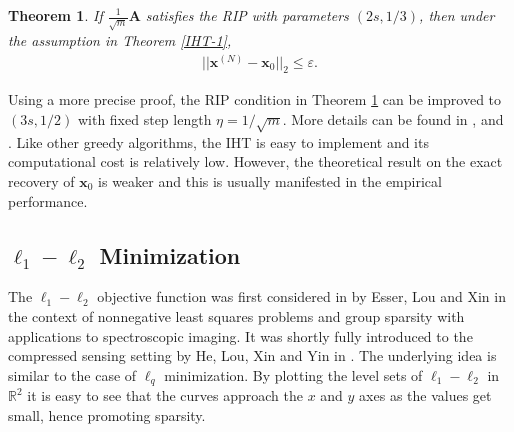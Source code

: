 \documentclass[11pt]{article}
\numberwithin{equation}{section}
\theoremstyle{plain}
\newtheorem{Th}{Theorem}[section]
\theoremstyle{definition}
\def\R{{\mathbb R}}
\def\R{{\mathbb R}}
\def\A{{\mathbf A}}
\def\x{{\mathbf x}}
\def\e{{\varepsilon}}
\begin{document}
\begin{Th}\label{IHT-2}
If $\frac{1}{\sqrt{m}}\A$ satisfies the RIP with parameters $(2s, 1/3)$, then under the assumption in Theorem \ref{IHT-1},
\begin{align}
||\x^{(N)}-\x_0||_2\leq \e. 
\end{align}
\end{Th}
Using a more precise proof, the RIP condition in Theorem \ref{IHT-2} can be improved to $(3s, 1/2)$ with fixed step length $\eta=1/\sqrt{m}$. More details can be found in \cite{blumensath2009iterative},  \cite{jain2017non} and \cite{garg2009gradient}. Like other greedy algorithms, the IHT is easy to implement and its computational cost is relatively low. However, the theoretical result on the exact recovery of $\x_0$ is weaker and this is usually manifested in the empirical performance. 


\subsection{$\ell_1-\ell_2$ Minimization}

The $\ell_1-\ell_2$ objective function was first considered in \cite{esser2013method} by Esser, Lou and Xin in the context of nonnegative least squares problems and group sparsity with applications to spectroscopic imaging. It was shortly fully introduced to the compressed sensing setting by He, Lou, Xin and Yin in \cite{yin2015minimization}. The underlying idea is similar to the case of $\ell_q$ minimization. By plotting the level sets of $\ell_1-\ell_2$ in $\R^2$ it is easy to see that the curves approach the $x$ and $y$ axes as the values get small, hence promoting sparsity. 
\end{document}
